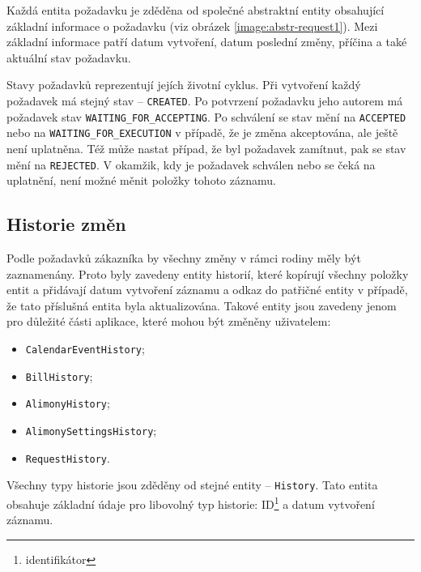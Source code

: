         Každá entita požadavku je zděděna od společné abstraktní entity obsahující základní informace o požadavku (viz obrázek \ref{image:abstr-request1}). Mezi základní informace patří datum vytvoření, datum poslední změny, příčina a také aktuální stav požadavku.
        
        Stavy požadavků reprezentují jejích životní cyklus. Při vytvoření každý požadavek má stejný stav -- \verb|CREATED|. Po potvrzení požadavku jeho autorem má požadavek stav \verb|WAITING_FOR_ACCEPTING|. Po schválení se stav mění na \verb|ACCEPTED| nebo na \verb|WAITING_FOR_EXECUTION| v případě, že je změna akceptována, ale ještě není uplatněna. Též může nastat případ, že byl požadavek zamítnut, pak se stav mění na \verb|REJECTED|. V okamžik, kdy je požadavek schválen nebo se čeká na uplatnění, není možné měnit položky tohoto záznamu.
    
    \subsection{Historie změn}
        Podle požadavků zákazníka by všechny změny v rámci rodiny měly být zaznamenány. Proto byly zavedeny entity historií, které kopírují všechny položky entit a přidávají datum vytvoření záznamu a odkaz do patřičné entity v případě, že tato příslušná entita byla aktualizována. Takové entity jsou zavedeny jenom pro důležité části aplikace, které mohou být změněny uživatelem:
        \begin{itemize}
            \item \texttt{CalendarEventHistory};
            \item \texttt{BillHistory};
            \item \texttt{AlimonyHistory};
            \item \texttt{AlimonySettingsHistory};
            \item \texttt{RequestHistory}.
        \end{itemize}
        Všechny typy historie jsou zděděny od stejné entity -- \verb|History|. Tato entita obsahuje základní údaje pro libovolný typ historie: ID\footnote{identifikátor} a datum vytvoření záznamu. 
     
